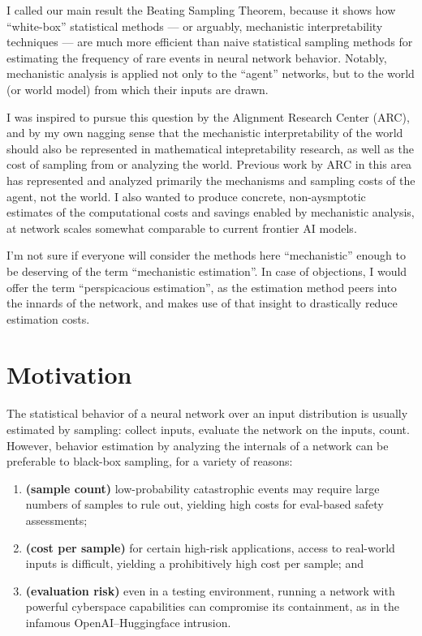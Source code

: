 \documentclass[10pt]{article}
\begin{document}
I called our main result the Beating Sampling Theorem, because it shows how ``white-box'' statistical methods --- or arguably, mechanistic interpretability techniques --- are much more efficient than naive statistical sampling methods for estimating the frequency of rare events in neural network behavior.  Notably, mechanistic analysis is applied not only to the ``agent'' networks, but to the world (or world model) from which their inputs are drawn.

I was inspired to pursue this question by the Alignment Research Center (ARC), and by my own nagging sense that the mechanistic interpretability of the world should also be represented in mathematical intepretability research, as well as the cost of sampling from or analyzing the world. Previous work by ARC in this area has represented and analyzed primarily the mechanisms and sampling costs of the agent, not the world.  I also wanted to produce concrete, non-aysmptotic estimates of the computational costs and savings enabled by mechanistic analysis, at network scales somewhat comparable to current frontier AI models.

I'm not sure if everyone will consider the methods here ``mechanistic'' enough to be deserving of the term ``mechanistic estimation''.  In case of objections, I would offer the term ``perspicacious estimation'', as the estimation method peers into the innards of the network, and makes use of that insight to drastically reduce estimation costs.

\section{Motivation}\label{sec:motivation}

The statistical behavior of a neural network over an input distribution is usually estimated by sampling: collect inputs, evaluate the network on the inputs, count. However, behavior estimation by analyzing the internals of a network can be preferable to black-box sampling, for a variety of reasons:
\begin{enumerate}
\item \textbf{(sample count)} low-probability catastrophic events may require large numbers of samples to rule out, yielding high costs for eval-based safety assessments;
\item \textbf{(cost per sample)} for certain high-risk applications, access to real-world inputs is difficult, yielding a prohibitively high cost per sample; and
\item \textbf{(evaluation risk)} even in a testing environment, running a network with powerful cyberspace capabilities can compromise its containment, as in the infamous OpenAI–Huggingface intrusion.
\end{enumerate}
\end{document}
